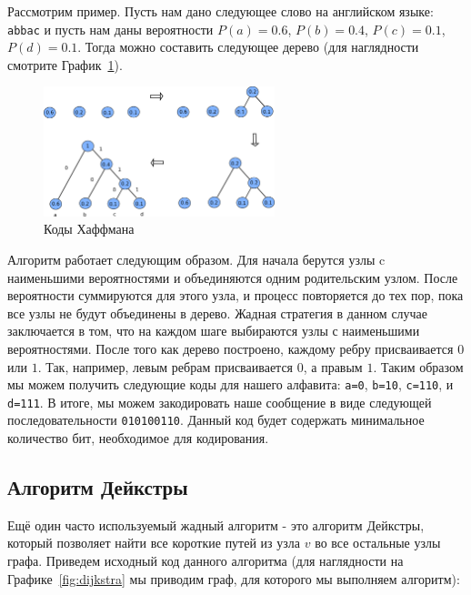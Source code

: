 Рассмотрим пример. Пусть нам дано следующее слово на английском
языке: \texttt{abbac} и пусть нам даны вероятности $P(a)=0.6$, 
$P(b)=0.4$, $P(c)=0.1$, $P(d)=0.1$. Тогда можно составить следующее 
дерево (для наглядности смотрите График~\ref{fig:huffman}). 

\begin{figure}
\centering
\includegraphics[width=0.6\textwidth]{graphics/huffman.png}
\caption{Коды Хаффмана}
\label{fig:huffman}
\end{figure}

Алгоритм работает следующим образом. Для начала берутся 
узлы c наименьшими вероятностями и объединяются одним родительским узлом.
После вероятности суммируются для этого узла, и процесс повторяется до тех
пор, пока все узлы не будут объединены в дерево. Жадная стратегия 
в данном случае заключается в том, что на каждом шаге выбираются
узлы с наименьшими вероятностями. После того как дерево построено,
каждому ребру присваивается $0$ или $1$. Так, например, левым ребрам
присваивается $0$, а правым $1$. Таким образом мы можем получить следующие
коды для нашего алфавита: \texttt{a=0}, \texttt{b=10}, \texttt{c=110}, и
\texttt{d=111}. В итоге, мы можем закодировать наше сообщение в виде следующей 
последовательности \texttt{010100110}. Данный код будет содержать 
минимальное количество бит, необходимое для кодирования.


\subsection{Алгоритм Дейкстры}
Ещё один часто используемый жадный алгоритм - это алгоритм Дейкстры, который позволяет
найти все короткие путей из узла $v$ во все остальные узлы графа. Приведем
исходный код данного алгоритма (для наглядности на Графике~\ref{fig:dijkstra}
мы приводим граф, для которого мы выполняем алгоритм):

